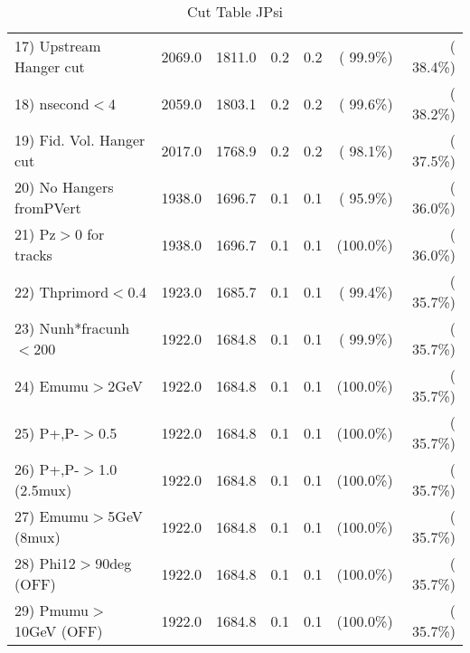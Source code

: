 \begin{table}[h!]
\begin{tabular}{||l||r|r|r|r|r|r||}
 17) Upstream Hanger cut  &       2069.0 &       1811.0 &          0.2 &          0.2 & ( 99.9\%) & ( 38.4\%) \\
 18) nsecond$<$4          &       2059.0 &       1803.1 &          0.2 &          0.2 & ( 99.6\%) & ( 38.2\%) \\
 19) Fid. Vol. Hanger cut &       2017.0 &       1768.9 &          0.2 &          0.2 & ( 98.1\%) & ( 37.5\%) \\
 20) No Hangers fromPVert &       1938.0 &       1696.7 &          0.1 &          0.1 & ( 95.9\%) & ( 36.0\%) \\
 21) Pz$>$0 for tracks    &       1938.0 &       1696.7 &          0.1 &          0.1 & (100.0\%) & ( 36.0\%) \\
 22) Thprimord$<$0.4      &       1923.0 &       1685.7 &          0.1 &          0.1 & ( 99.4\%) & ( 35.7\%) \\
 23) Nunh*fracunh$<$200   &       1922.0 &       1684.8 &          0.1 &          0.1 & ( 99.9\%) & ( 35.7\%) \\
 24) Emumu$>$2GeV         &       1922.0 &       1684.8 &          0.1 &          0.1 & (100.0\%) & ( 35.7\%) \\
 25) P+,P-$>$0.5          &       1922.0 &       1684.8 &          0.1 &          0.1 & (100.0\%) & ( 35.7\%) \\
 26) P+,P-$>$1.0 (2.5mux) &       1922.0 &       1684.8 &          0.1 &          0.1 & (100.0\%) & ( 35.7\%) \\
 27) Emumu$>$5GeV  (8mux) &       1922.0 &       1684.8 &          0.1 &          0.1 & (100.0\%) & ( 35.7\%) \\
 28) Phi12$>$90deg  (OFF) &       1922.0 &       1684.8 &          0.1 &          0.1 & (100.0\%) & ( 35.7\%) \\
 29) Pmumu$>$10GeV  (OFF) &       1922.0 &       1684.8 &          0.1 &          0.1 & (100.0\%) & ( 35.7\%) \\
 \hline
 \hline
 \end{tabular}
 \caption{Cut Table  JPsi     }
 \label{tab-cutcohjpsi-mumu_jpsi}
 \end{table}
